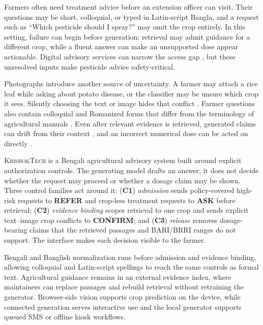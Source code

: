 \documentclass[11pt,a4paper]{article}
\begin{document}
Farmers often need treatment advice before an extension officer can visit. Their questions may be short, colloquial, or typed in Latin-script Bangla, and a request such as ``Which pesticide should I spray?'' may omit the crop entirely. In this setting, failure can begin before generation: retrieval may admit guidance for a different crop, while a fluent answer can make an unsupported dose appear actionable. Digital advisory services can narrow the access gap \citep{dae_extension_manual,aker-2011-dial-a,fabregas-etal-2019-digital}, but these unresolved inputs make pesticide advice safety-critical.

Photographs introduce another source of uncertainty. A farmer may attach a rice leaf while asking about potato disease, or the classifier may be unsure which crop it sees. Silently choosing the text or image hides that conflict \citep{Deng_2025_CVPR,zhu2024cross}. Farmer questions also contain colloquial and Romanized forms that differ from the terminology of agricultural manuals \citep{bhuiyan-etal-2025-bhasabodh,our_bengali_retrieval,parikh-solorio-2021-normalization}. Even after relevant evidence is retrieved, generated claims can drift from their context \citep{brown-etal-2025-rag,xu-etal-2025-mega-rag}, and an incorrect numerical dose can be acted on directly \citep{our_agricultural_safety}.

\textsc{KrishokTech} is a Bengali agricultural advisory system built around explicit authorization controls. The generating model drafts an answer; it does not decide whether the request may proceed or whether a dosage claim may be shown. Three control families act around it: (\textbf{C1}) \emph{admission} sends policy-covered high-risk requests to \textbf{REFER} and crop-less treatment requests to \textbf{ASK} before retrieval; (\textbf{C2}) \emph{evidence binding} scopes retrieval to one crop and sends explicit text--image crop conflicts to \textbf{CONFIRM}; and (\textbf{C3}) \emph{release} removes dosage-bearing claims that the retrieved passages and BARI/BRRI ranges do not support. The interface makes each decision visible to the farmer.

Bengali and Banglish normalization runs before admission and evidence binding, allowing colloquial and Latin-script spellings to reach the same controls as formal text. Agricultural guidance remains in an external evidence index, where maintainers can replace passages and rebuild retrieval without retraining the generator. Browser-side vision supports crop prediction on the device, while connected generation serves interactive use and the local generator supports queued SMS or offline kiosk workflows.
\end{document}
